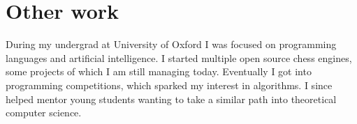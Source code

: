 \documentclass[10pt]{article}
\begin{document}
\section{Other work}

During my undergrad at University of Oxford I was focused on programming languages and artificial intelligence.
I started multiple open source chess engines, some projects of which I am still managing today.
Eventually I got into programming competitions, which sparked my interest in algorithms.
I since helped mentor young students wanting to take a similar path into theoretical computer science.



\end{document}
